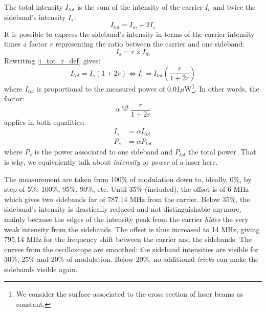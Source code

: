 \documentclass[11pt]{report}
\begin{document}
The total intensity $I_{tot}$ is the sum of the intensity of the carrier $I_c$ and twice the sideband's intensity $I_s$:
\begin{equation}
\label{i_tot_r_def}
I_{tot} = I_m + 2 I_s
\end{equation}
It is possible to express the sideband's intensity in terms of the carrier intensity times a factor $r$ representing the ratio between the carrier and one sideband:
\begin{equation}
I_s = r \times I_m
\end{equation}
Rewriting \eqref{i_tot_r_def} gives:
\begin{equation}
I_{tot} = I_s (1+2r) \Leftrightarrow I_s = I_{tot} \left( \frac{r}{1+2r} \right)
\end{equation}
where $I_{tot}$ is proportional to the measured power of 0.01$\mu$W\footnote{We consider the surface associated to the cross section of laser beams as constant.}. In other words, the factor:
\begin{equation}
\alpha \stackrel{\text{def}}{=} \frac{r}{1+2r}
\end{equation}
applies in both equalities:
\begin{align}
I_{s} &= \alpha I_{tot}\\
P_{s} &= \alpha P_{tot}
\end{align}
where $P_{s}$ is the power associated to one sideband and $P_{tot}$ the total power. That is why, we equivalently talk about \textit{intensity} or \textit{power} of a laser here.

The measurement are taken from 100\% of modulation down to, ideally, 0\%, by step of 5\%: 100\%, 95\%, 90\%, etc. Until 35\% (included), the offset is of 6 MHz which gives two sidebands far of 787.14 MHz from the carrier. Below 35\%, the sideband's intensity is drastically reduced and not distinguishable anymore, mainly because the edges of the intensity peak from the carrier \textit{hides} the very weak intensity from the sidebands. The offset is thus increased to 14 MHz, giving 795.14 MHz for the frequency shift between the carrier and the sidebands. The curves from the oscilloscope are smoothed: the sideband intensities are visible for 30\%, 25\% and 20\% of modulation. Below 20\%, no additional \textit{tricks} can make the sidebands visible again.
\end{document}
